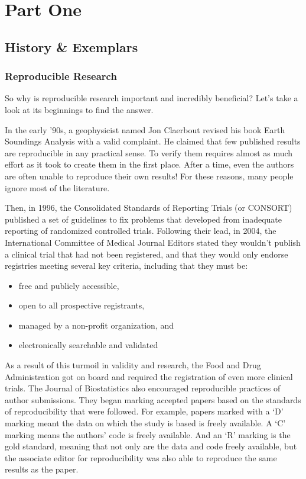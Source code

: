 \documentclass[]{book}
\providecommand{\tightlist}{%
  \setlength{\itemsep}{0pt}\setlength{\parskip}{0pt}}
\theoremstyle{definition}
\theoremstyle{definition}
\theoremstyle{definition}
\theoremstyle{remark}
\begin{document}
\mainmatter

\part{Part One}\label{part-part-one}

\chapter{History \& Exemplars}\label{history}

\section{Reproducible Research}\label{reproducible-research}

So why is reproducible research important and incredibly beneficial?
Let's take a look at its beginnings to find the answer.

In the early '90s, a geophysicist named Jon Claerbout revised his book
Earth Soundings Analysis with a valid complaint. He claimed that few
published results are reproducible in any practical sense. To verify
them requires almost as much effort as it took to create them in the
first place. After a time, even the authors are often unable to
reproduce their own results! For these reasons, many people ignore most
of the literature.

Then, in 1996, the Consolidated Standards of Reporting Trials (or
CONSORT) published a set of guidelines to fix problems that developed
from inadequate reporting of randomized controlled trials. Following
their lead, in 2004, the International Committee of Medical Journal
Editors stated they wouldn't publish a clinical trial that had not been
registered, and that they would only endorse registries meeting several
key criteria, including that they must be:

\begin{itemize}
\tightlist
\item
  free and publicly accessible,
\item
  open to all prospective registrants,
\item
  managed by a non-profit organization, and
\item
  electronically searchable and validated
\end{itemize}

As a result of this turmoil in validity and research, the Food and Drug
Administration got on board and required the registration of even more
clinical trials. The Journal of Biostatistics also encouraged
reproducible practices of author submissions. They began marking
accepted papers based on the standards of reproducibility that were
followed. For example, papers marked with a `D' marking meant the data
on which the study is based is freely available. A `C' marking means the
authors' code is freely available. And an `R' marking is the gold
standard, meaning that not only are the data and code freely available,
but the associate editor for reproducibility was also able to reproduce
the same results as the paper.
\end{document}
